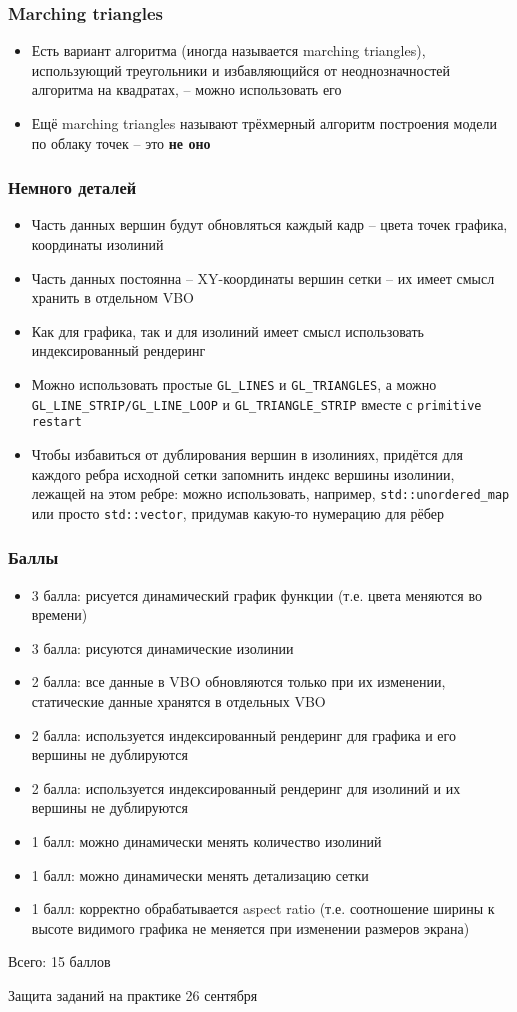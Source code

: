 \documentclass{beamer}
\begin{document}
\begin{frame}[fragile]
\frametitle{Marching triangles}
\begin{itemize}
\item Есть вариант алгоритма (иногда называется marching triangles), использующий треугольники и избавляющийся от неоднозначностей алгоритма на квадратах, -- можно использовать его
\pause
\item Ещё marching triangles называют трёхмерный алгоритм построения модели по облаку точек -- это \textbf{не оно}
\end{itemize}
\end{frame}

\begin{frame}[fragile]
\frametitle{Немного деталей}
\begin{itemize}
\item Часть данных вершин будут обновляться каждый кадр -- цвета точек графика, координаты изолиний
\item Часть данных постоянна -- XY-координаты вершин сетки -- их имеет смысл хранить в отдельном VBO
\item Как для графика, так и для изолиний имеет смысл использовать индексированный рендеринг
\item Можно использовать простые \verb|GL_LINES| и \verb|GL_TRIANGLES|, а можно \verb|GL_LINE_STRIP/GL_LINE_LOOP| и \verb|GL_TRIANGLE_STRIP| вместе с \verb|primitive restart|
\item Чтобы избавиться от дублирования вершин в изолиниях, придётся для каждого ребра исходной сетки запомнить индекс вершины изолинии, лежащей на этом ребре: можно использовать, например, \verb|std::unordered_map| или просто \verb|std::vector|, придумав какую-то нумерацию для рёбер
\end{itemize}
\end{frame}

\begin{frame}[fragile]
\frametitle{Баллы}
\begin{itemize}
\item 3 балла: рисуется динамический график функции (т.е. цвета меняются во времени)
\item 3 балла: рисуются динамические изолинии
\item 2 балла: все данные в VBO обновляются только при их изменении, статические данные хранятся в отдельных VBO
\item 2 балла: используется индексированный рендеринг для графика и его вершины не дублируются
\item 2 балла: используется индексированный рендеринг для изолиний и их вершины не дублируются
\item 1 балл:  можно динамически менять количество изолиний
\item 1 балл:  можно динамически менять детализацию сетки
\item 1 балл:  корректно обрабатывается aspect ratio (т.е. соотношение ширины к высоте видимого графика не меняется при изменении размеров экрана)
\end{itemize}
Всего: 15 баллов

Защита заданий на практике 26 сентября
\end{frame}
\end{document}
